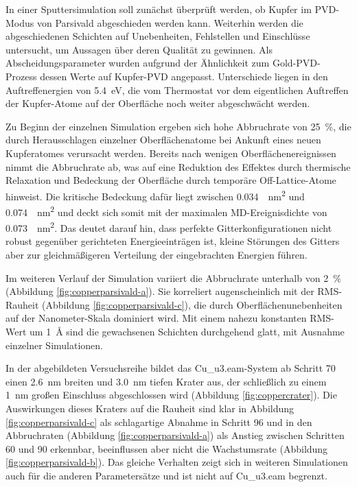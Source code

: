 In einer Sputtersimulation soll zunächst überprüft werden, ob Kupfer im PVD-Modus von Parsivald abgeschieden werden kann.
Weiterhin werden die abgeschiedenen Schichten auf Unebenheiten, Fehlstellen und Einschlüsse untersucht, um Aussagen über deren Qualität zu gewinnen.
Als Abscheidungsparameter wurden aufgrund der Ähnlichkeit zum Gold-PVD-Prozess dessen Werte auf Kupfer-PVD angepasst.
Unterschiede liegen in den Auftreffenergien von \SI{5.4}{\electronvolt}, die vom Thermostat vor dem eigentlichen Auftreffen der Kupfer-Atome auf der Oberfläche noch weiter abgeschwächt werden.

Zu Beginn der einzelnen Simulation ergeben sich hohe Abbruchrate von \SI{25}{\percent}, die durch Herausschlagen einzelner Oberflächenatome bei Ankunft eines neuen Kupferatomes verursacht werden.
Bereits nach wenigen Oberflächenereignissen nimmt die Abbruchrate ab, was auf eine Reduktion des Effektes durch thermische Relaxation und Bedeckung der Oberfläche durch temporäre Off-Lattice-Atome hinweist.
Die kritische Bedeckung dafür liegt zwischen \SI{0.034}{\per\nano\meter\squared} und \SI{0.074}{\per\nano\meter\squared} und deckt sich somit mit der maximalen MD-Ereignisdichte von \SI{0.073}{\per\nano\meter\squared}.
Das deutet darauf hin, dass perfekte Gitterkonfigurationen nicht robust gegenüber gerichteten Energieeinträgen ist, kleine Störungen des Gitters aber zur gleichmäßigeren Verteilung der eingebrachten Energien führen.

Im weiteren Verlauf der Simulation variiert die Abbruchrate unterhalb von \SI{2}{\percent} (Abbildung \ref{fig:copperparsivald-a}).
Sie korreliert augenscheinlich mit der RMS-Rauheit (Abbildung \ref{fig:copperparsivald-c}), die durch Oberflächenunebenheiten auf der Nanometer-Skala dominiert wird.
Mit einem nahezu konstanten RMS-Wert um \SI{1}{\angstrom} sind die gewachsenen Schichten durchgehend glatt, mit Ausnahme einzelner Simulationen.

In der abgebildeten Versuchsreihe bildet das Cu\_u3.eam-System ab Schritt 70 einen \SI{2.6}{\nano\meter} breiten und \SI{3.0}{\nano\meter} tiefen Krater aus, der schließlich zu einem \SI{1}{\nano\meter} großen Einschluss abgeschlossen wird (Abbildung \ref{fig:coppercrater}).
Die Auswirkungen dieses Kraters auf die Rauheit sind klar in Abbildung \ref{fig:copperparsivald-c} als schlagartige Abnahme in Schritt 96 und in den Abbruchraten (Abbildung \ref{fig:copperparsivald-a}) als Anstieg zwischen Schritten 60 und 90 erkennbar, beeinflussen aber nicht die Wachstumsrate (Abbildung \ref{fig:copperparsivald-b}).
Das gleiche Verhalten zeigt sich in weiteren Simulationen auch für die anderen Parametersätze und ist nicht auf Cu\_u3.eam begrenzt.

